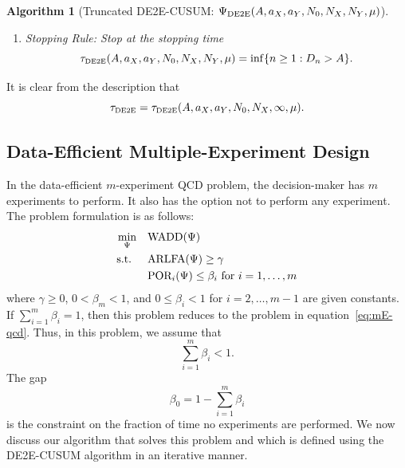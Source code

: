 \documentclass[journal, onecolumn]{IEEEtran}
\def\ds{\displaystyle}  %
\newtheorem{algorithm}{Algorithm}
\begin{document}
\begin{algorithm}[Truncated DE2E-CUSUM: $\Psi_{\textup{DE2E}} (A, a_X, a_Y, N_0, N_X, N_Y, \mu)$]
\begin{enumerate}
\begin{enumerate}
    \item If $D_{\sigma^X (a_Y U_Y)} < a_Y U_Y$, we do not perform any experiment, but still scale the undershoot $U_X = D_{\sigma^X (a_Y U_Y)}$ by a factor of $a_X$ and use $a_X U_X$ as the starting level for deterministically updating $D_n$ as
    $$ D_{n + 1} = D_n + \mu. $$
    This continues until either $D_n$ goes above $a_Y U_Y$ or $N_0$ number of deterministic updates are used. At this time, we reset $D_n$ to $a_Y U_Y$ and continue updating $D_n$ as in step $\textup{c)}$.
    \end{enumerate}

\item Stopping Rule: Stop at the stopping time
$$ \tau_{\textup{\fontsize{6 pt}{10 pt}\selectfont DE2E}}(A, a_X, a_Y, N_0, N_X, N_Y, \mu) = \inf \{ n \geq 1: D_n > A \}. $$
\end{enumerate}    
\end{algorithm}
It is clear from the description that 
$$ \tau_{\textup{\fontsize{6 pt}{10 pt}\selectfont DE2E}} = \tau_{\textup{\fontsize{6 pt}{10 pt}\selectfont DE2E}}(A, a_X, a_Y, N_0, N_X, \infty, \mu). $$


\subsection{Data-Efficient Multiple-Experiment Design}

In the data-efficient $m$-experiment QCD problem, the decision-maker has $m$ experiments to perform. It also has the option not to perform any experiment. The problem formulation is as follows:
\begin{align}
\begin{split}
\min_{\Psi} \quad & \textup{WADD} (\Psi) \\
\text{s.t. } \quad & \textup{ARLFA} (\Psi) \geq \gamma \\
& \textup{POR}_i (\Psi) \leq \beta_i \text{ for } i = 1, \dots, m
\end{split}
\end{align}
where $\gamma \geq 0$, $0 < \beta_m < 1$, and $0 \leq \beta_i < 1$ for $i = 2, \dots, m - 1$ are given constants. If $\ds \sum_{i = 1}^m \beta_i = 1$, then this problem reduces to the problem in equation~\eqref{eq:mE-qcd}. Thus, in this problem, we assume that
$$ \sum_{i = 1}^m \beta_i < 1. $$
The gap
$$ \beta_0 = 1 - \sum_{i = 1}^m \beta_i $$
is the constraint on the fraction of time no experiments are performed. We now discuss our algorithm that solves this problem and which is defined using the DE2E-CUSUM algorithm in an iterative manner. 
\end{document}
